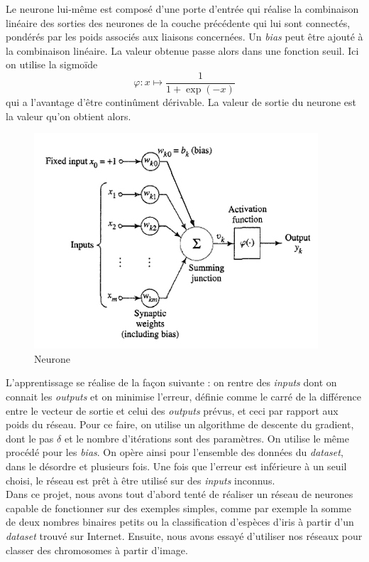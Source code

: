 \documentclass[a4paper,10pt]{article}
\begin{document}
Le neurone lui-même est composé d'une porte d'entrée qui réalise la combinaison linéaire des sorties des neurones de la couche
précédente qui lui sont connectés, pondérés par les poids associés aux liaisons concernées. Un \textit{bias} peut être ajouté
à la combinaison linéaire. La valeur obtenue
passe alors dans une fonction seuil. Ici on utilise la sigmoïde $$ \varphi : x \longmapsto \frac{1}{1+\exp(-x)}$$ qui a l'avantage
d'être continûment dérivable. La valeur de sortie du neurone est la valeur qu'on obtient alors.
\begin{figure}[H]
\centering
\includegraphics[scale = 0.6]{neuron}
\caption{Neurone}
 
\end{figure}

L'apprentissage se réalise de la façon suivante : on rentre des \textit{inputs} dont on connait les \textit{outputs} et on minimise
l'erreur, définie comme le carré de la différence entre le vecteur de sortie et celui des \textit{outputs} prévus, et ceci par rapport
aux poids du réseau. Pour ce faire, on utilise un algorithme de descente du gradient, dont le pas $\delta$ et le nombre d'itérations 
sont des paramètres. On utilise le même procédé pour les \textit{bias}. On opère ainsi pour l'ensemble des données du \textit{dataset}, 
dans le désordre et plusieurs fois. Une fois que l'erreur est inférieure à un seuil choisi, le réseau est prêt à être utilisé 
sur des \textit{inputs} inconnus.
\\
Dans ce projet, nous avons tout d'abord tenté de réaliser un réseau de neurones capable de fonctionner sur des exemples simples, comme 
par exemple la somme de deux nombres binaires petits ou la classification d'espèces d'iris à partir d'un \textit{dataset} trouvé
sur Internet. Ensuite, nous avons essayé d'utiliser nos réseaux pour classer des chromosomes à partir d'image.
\end{document}
